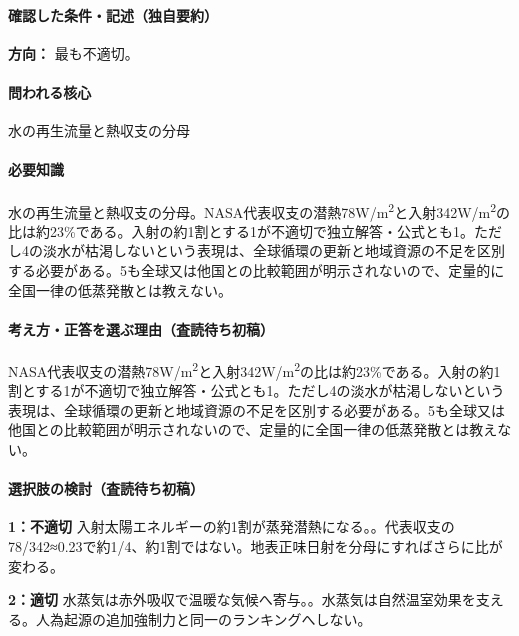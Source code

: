 \paragraph{確認した条件・記述（独自要約）}\mbox{}\par

\noindent\textbf{方向：} 最も不適切。\par

\paragraph{問われる核心} 水の再生流量と熱収支の分母

\paragraph{必要知識} 水の再生流量と熱収支の分母。NASA代表収支の潜熱78W/m\textsuperscript{2}と入射342W/m\textsuperscript{2}の比は約23\%である。入射の約1割とする1が不適切で独立解答・公式とも1。ただし4の淡水が枯渇しないという表現は、全球循環の更新と地域資源の不足を区別する必要がある。5も全球又は他国との比較範囲が明示されないので、定量的に全国一律の低蒸発散とは教えない。

\paragraph{考え方・正答を選ぶ理由（査読待ち初稿）} NASA代表収支の潜熱78W/m\textsuperscript{2}と入射342W/m\textsuperscript{2}の比は約23\%である。入射の約1割とする1が不適切で独立解答・公式とも1。ただし4の淡水が枯渇しないという表現は、全球循環の更新と地域資源の不足を区別する必要がある。5も全球又は他国との比較範囲が明示されないので、定量的に全国一律の低蒸発散とは教えない。

\paragraph{選択肢の検討（査読待ち初稿）}\mbox{}\par

\noindent\textbf{1：不適切} 入射太陽エネルギーの約1割が蒸発潜熱になる。。代表収支の78/342≈0.23で約1/4、約1割ではない。地表正味日射を分母にすればさらに比が変わる。\par

\noindent\textbf{2：適切} 水蒸気は赤外吸収で温暖な気候へ寄与。。水蒸気は自然温室効果を支える。人為起源の追加強制力と同一のランキングへしない。\par

